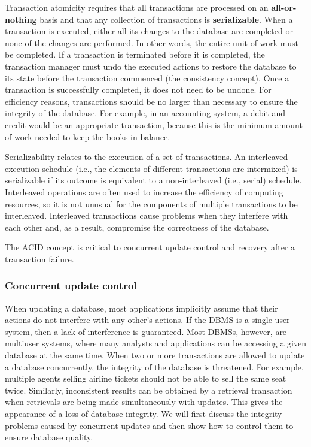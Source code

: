\documentclass[
]{article}
\begin{document}
Transaction atomicity requires that all transactions are processed on an
\textbf{all-or-nothing} basis and that any collection of transactions is
\textbf{serializable}. When a transaction is executed, either all its changes
to the database are completed or none of the changes are performed. In
other words, the entire unit of work must be completed. If a transaction
is terminated before it is completed, the transaction manager must undo
the executed actions to restore the database to its state before the
transaction commenced (the consistency concept). Once a transaction is
successfully completed, it does not need to be undone. For efficiency
reasons, transactions should be no larger than necessary to ensure the
integrity of the database. For example, in an accounting system, a debit
and credit would be an appropriate transaction, because this is the
minimum amount of work needed to keep the books in balance.

Serializability relates to the execution of a set of transactions. An
interleaved execution schedule (i.e., the elements of different
transactions are intermixed) is serializable if its outcome is
equivalent to a non-interleaved (i.e., serial) schedule. Interleaved
operations are often used to increase the efficiency of computing
resources, so it is not unusual for the components of multiple
transactions to be interleaved. Interleaved transactions cause problems
when they interfere with each other and, as a result, compromise the
correctness of the database.

The ACID concept is critical to concurrent update control and recovery
after a transaction failure.

\hypertarget{concurrent-update-control}{%
\subsubsection*{Concurrent update control}\label{concurrent-update-control}}

When updating a database, most applications implicitly assume that their
actions do not interfere with any other's actions. If the DBMS is a
single-user system, then a lack of interference is guaranteed. Most
DBMSs, however, are multiuser systems, where many analysts and
applications can be accessing a given database at the same time. When
two or more transactions are allowed to update a database concurrently,
the integrity of the database is threatened. For example, multiple
agents selling airline tickets should not be able to sell the same seat
twice. Similarly, inconsistent results can be obtained by a retrieval
transaction when retrievals are being made simultaneously with updates.
This gives the appearance of a loss of database integrity. We will first
discuss the integrity problems caused by concurrent updates and then
show how to control them to ensure database quality.
\end{document}
